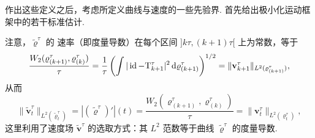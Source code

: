 作出这些定义之后，考虑所定义曲线与速度的一些先验界. 首先给出极小化运动框架中的若干标准估计.

注意，$\widetilde\varrho^\tau$ 的\label{idx:i99-p298}
速率（即度量导数）在每个区间 $]k\tau,(k+1)\tau[$ 上为常数，等于
\[
\frac{W_2(\varrho_{(k+1)}^\tau,\varrho_{(k)}^\tau)}\tau
=\frac1\tau\left(\int|\operatorname{id}-\mathrm T_{k+1}^\tau|^2\,\mathrm d\varrho_{(k+1)}^\tau\right)^{1/2}
=\|\mathbf v_{k+1}^\tau\|_{L^2(\varrho_{(k+1)}^\tau)},
\]
从而
\[
\|\widetilde{\mathbf v}_t^\tau\|_{L^2(\widetilde\varrho_t^\tau)}
=|(\widetilde\varrho^\tau)'|(t)
=\frac{W_2(\varrho_{(k+1)}^\tau,\varrho_{(k)}^\tau)}\tau
=\|\mathbf v_t^\tau\|_{L^2(\varrho_t^\tau)},
\]
这里利用了速度场 $\widetilde{\mathbf v}^\tau$ 的选取方式：其 $L^2$ 范数等于曲线 $\widetilde\varrho^\tau$ 的度量导数.

